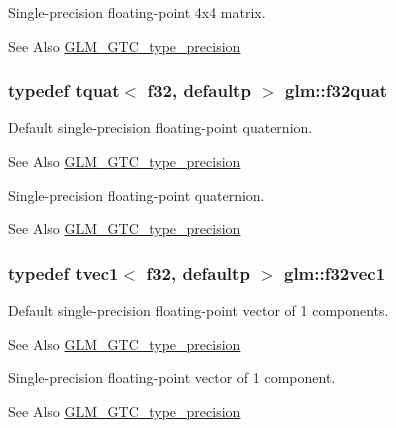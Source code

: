 Single-\/precision floating-\/point 4x4 matrix. \begin{DoxySeeAlso}{See Also}
\hyperlink{group__gtc__type__precision}{G\-L\-M\-\_\-\-G\-T\-C\-\_\-type\-\_\-precision} 
\end{DoxySeeAlso}
\hypertarget{group__gtc__type__precision_gac59c4d798396552e4bbb866b3d8a2f18}{
\subsubsection[{f32quat}]{\setlength{\rightskip}{0pt plus 5cm}typedef tquat$<$ f32, defaultp $>$ {\bf glm\-::f32quat}}}\label{group__gtc__type__precision_gac59c4d798396552e4bbb866b3d8a2f18}
Default single-\/precision floating-\/point quaternion. \begin{DoxySeeAlso}{See Also}
\hyperlink{group__gtc__type__precision}{G\-L\-M\-\_\-\-G\-T\-C\-\_\-type\-\_\-precision}
\end{DoxySeeAlso}
Single-\/precision floating-\/point quaternion. \begin{DoxySeeAlso}{See Also}
\hyperlink{group__gtc__type__precision}{G\-L\-M\-\_\-\-G\-T\-C\-\_\-type\-\_\-precision} 
\end{DoxySeeAlso}
\hypertarget{group__gtc__type__precision_ga6fb588b465f2252b473582159c31c40c}{
\subsubsection[{f32vec1}]{\setlength{\rightskip}{0pt plus 5cm}typedef tvec1$<$ f32, defaultp $>$ {\bf glm\-::f32vec1}}}\label{group__gtc__type__precision_ga6fb588b465f2252b473582159c31c40c}
Default single-\/precision floating-\/point vector of 1 components. \begin{DoxySeeAlso}{See Also}
\hyperlink{group__gtc__type__precision}{G\-L\-M\-\_\-\-G\-T\-C\-\_\-type\-\_\-precision}
\end{DoxySeeAlso}
Single-\/precision floating-\/point vector of 1 component. \begin{DoxySeeAlso}{See Also}
\hyperlink{group__gtc__type__precision}{G\-L\-M\-\_\-\-G\-T\-C\-\_\-type\-\_\-precision} 
\end{DoxySeeAlso}
